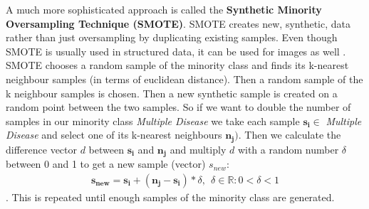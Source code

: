 \documentclass[10pt,twocolumn,letterpaper]{article}
\begin{document}
A much more sophisticated approach is called the \textbf{Synthetic Minority Oversampling Technique (SMOTE)}. SMOTE creates new, synthetic, data rather than just oversampling by duplicating existing samples. Even though SMOTE is usually used in structured data, it can be used for images as well \cite{abeysinghe2018clustering, johnson2013hybrid}. SMOTE chooses a random sample of the minority class and finds its k-nearest neighbour samples (in terms of euclidean distance). Then a random sample of the k neighbour samples is chosen. Then a new synthetic sample is created on a random point between the two samples. So if we want to double the number of samples in our minority class \textit{Multiple Disease} we take each sample $\mathbf{s_i} \in $ \textit{Multiple Disease} and select one of its k-nearest neighbours $\mathbf{n_j})$. Then we calculate the difference vector $d$ between $\mathbf{s_i} $ and $\mathbf{n_j} $ and multiply $d$ with a random number $\delta$ between 0 and 1 to get a new sample (vector) $s_{new}$:
\begin{align}
\mathbf{s_{new}} = \mathbf{s_i} + (\mathbf{n_j}  - \mathbf{s_i}) * \delta,\ \  \delta \in \mathbb{R}: 0 < \delta < 1
\end{align}
\cite{maciejewski2011local}. This is repeated until enough samples of the minority class are generated.
\end{document}

